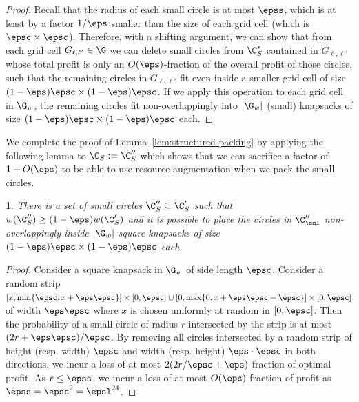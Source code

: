 \documentclass[10pt,a4paper]{article}
\theoremstyle{plain}
\theoremstyle{plain}
\newtheorem{lem}[theorem]{\protect\lemmaname}
\theoremstyle{plain}
\theoremstyle{definition}
\providecommand{\lemmaname}{Lemma}
\newcommand{\agtwo}[1]{#1}
\begin{document}
{\begin{proof}
	Recall that the radius of each
	small circle is at most $\epss$, which is at least by a factor
	$1/\eps$ smaller than the size of each grid cell (which is $\epsc \times\epsc$).
	Therefore, with a shifting argument, we can show that from each grid
	cell $G_{\ell,\ell'}\in\G$ we can delete small circles from $\C^*_S$ contained in
	$G_{\ell,\ell'}$ whose total profit is only an $O(\eps)$-fraction
	of the overall profit of those circles, such
	that the remaining circles in $G_{\ell,\ell'}$ fit even inside a smaller
	grid cell of size $(1-\eps)\epsc \times(1-\eps)\epsc$.
	If we apply this operation to each grid cell in $\G_{w}$, the remaining
	circles fit non-overlappingly into $|\G_{w}|$ (small) knapsacks of
	size $(1-\eps)\epsc \times(1-\eps)\epsc$
	each.
\end{proof}

We complete the proof of Lemma~\ref{lem:structured-packing} by applying the following lemma to $\C_{S}:= \C''_{S}$
which shows that we can sacrifice a factor of $1+O(\eps)$ \agtwo{to be} able to use resource augmentation when we pack the small circles.

\begin{lem}
	\label{lem:grid-resource-augmentation-1}
	There is a set of small circles $\C''_{S}\subseteq\C'_{S}$ such that $w(\C''_{S})\ge(1-\eps)w(\C'_{S})$ and it is possible to place the circles in $\C''_{\sml}$ non-overlappingly inside $|\G_{w}|$ square knapsacks of size $(1-\eps)\epsc \times(1-\eps)\epsc$ each.
	\end{lem}

\begin{proof}
	Consider a square knapsack in $\G_{w}$ of side length $\epsc$.
        Consider a random strip $[x, \min\{\epsc, x+\eps\epsc\}]\times [0,\epsc] \cup [0, \max\{0, x+\eps\epsc -\epsc\}] \times [0,\epsc]$ of width $\eps\epsc$ where $x$ is chosen uniformly at random in $[0,\epsc]$. Then the probability of a small circle of radius $r$ intersected by the strip is at most $(2r+\eps\epsc)/\epsc$.
	By removing all circles intersected by a random strip of height (resp. width) $\epsc$ and width (resp. height) $\eps\cdot\epsc$ in both directions, we incur a loss of at most $2(2 r/\epsc + \eps)$ fraction of optimal profit. As $r\le \epss$, we incur a loss of at most $O(\eps)$ fraction of profit as $\epss = \epsc^2 = \epsl^{24}$.
\end{proof}



}
\end{document}
